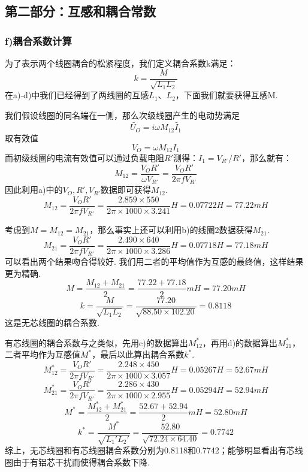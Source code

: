 \documentclass[UTF8]{ctexart}
\begin{document}
\subsection*{第二部分：互感和耦合常数}
\subsubsection*{f)耦合系数计算}
为了表示两个线圈耦合的松紧程度，我们定义耦合系数k满足：
\begin{equation}
    k=\frac{M}{\sqrt{L_1L_2}}
\end{equation}
在a)-d)中我们已经得到了两线圈的互感$L_1$、$L_2$，下面我们就要获得互感M.\par
我们假设线圈的同名端在一侧，那么次级线圈产生的电动势满足
\begin{equation}
    \tilde{U_O}=i\omega M_{12}\tilde{I_1}
\end{equation}
取有效值
\begin{equation}
    V_O=\omega M_{12} I_1
\end{equation}
而初级线圈的电流有效值可以通过负载电阻$R'$测得：$I_1=V_{R'}/R'$，那么就有：
\begin{equation}
    M_{12}=\frac{V_O R'}{\omega V_{R'}}=\frac{V_O R'}{2\pi f V_{R'}}
\end{equation}
因此利用a)中的$V_O, R', V_{R'}$数据即可获得$M_{12}$. 
\[M_{12}=\frac{V_O R'}{2\pi f V_{R'}}=\frac{2.859\times 550}{2\pi\times 1000\times 3.241}H=0.07722H=77.22mH\]

考虑到$M=M_{12}=M_{21}$，那么事实上还可以利用b)的线圈2数据获得$M_{21}$.
\[M_{21}=\frac{V_O R'}{2\pi f V_{R'}}=\frac{2.490\times 640}{2\pi\times 1000\times 3.286}H=0.07718H=77.18mH\]
可以看出两个结果吻合得较好. 我们用二者的平均值作为互感的最终值，这样结果更为精确.
\[M=\frac{M_{12}+M_{21}}{2}=\frac{77.22+77.18}{2}mH=77.20mH\]
\[k=\frac{M}{\sqrt{L_1L_2}}=\frac{77.20}{\sqrt{88.50\times 102.20}}=0.8118\]
这是无芯线圈的耦合系数.\par
有芯线圈的耦合系数与之类似，先用c)的数据算出$M_{12}^*$，再用d)的数据算出$M_{21}^*$，二者平均作为互感值$M^*$，最后以此算出耦合系数$k^*$.
\[M_{12}^*=\frac{V_O R'}{2\pi f V_{R'}}=\frac{2.248\times 450}{2\pi\times 1000\times 3.057}H=0.05267H=52.67mH\]
\[M_{21}^*=\frac{V_O R'}{2\pi f V_{R'}}=\frac{2.286\times 430}{2\pi\times 1000\times 2.955}H=0.05294H=52.94mH\]
\[M^*=\frac{M_{12}^*+M_{21}^*}{2}=\frac{52.67+52.94}{2}mH=52.80mH\]
\[k^*=\frac{M^*}{\sqrt{L_1'L_2'}}=\frac{52.80}{\sqrt{72.24\times 64.40}}=0.7742\]
综上，无芯线圈和有芯线圈耦合系数分别为0.8118和0.7742；能够明显看出有芯线圈由于有铝芯干扰而使得耦合系数下降.
\end{document}
